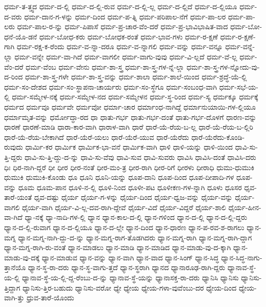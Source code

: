 {ಧರ್ಮ-ತ-ತ್ತ್ವದ
ಧರ್ಮ-ದ-ಲ್ಲಿ
ಧರ್ಮ-ದ-ಲ್ಲಿ-ರುವ
ಧರ್ಮ-ದ-ಲ್ಲಿ-ಲ್ಲ
ಧರ್ಮ-ದ-ಲ್ಲಿದೆ
ಧರ್ಮ-ದ-ಲ್ಲಿಯೂ
ಧರ್ಮ-ದ-ವರು
ಧರ್ಮ-ದಾನ-ಗ-ಳನ್ನು
ಧರ್ಮ-ದಿಂದ
ಧರ್ಮ-ಪ-ತ್ನಿ
ಧರ್ಮ-ಪರಿಪಾಲ-ನೆಗೆ
ಧರ್ಮ-ಪಾ-ಲರ
ಧರ್ಮ-ಪಾ-ಲರು
ಧರ್ಮ-ಪಾಲ-ರ-ನ್ನು
ಧರ್ಮ-ಪಿಪಾಸೆ
ಧರ್ಮ-ಪ್ರ-ಚಾರ-ವೆಂ-ದರೆ
ಧರ್ಮ-ಪ್ರ-ಭಾವಿಭಾಷಿತ-ವಾದ
ಧರ್ಮ-ಬೋ-ಧನೆ-ಯೊ-ಡನೆ
ಧರ್ಮ-ಬೋಧ-ಕರು
ಧರ್ಮ-ಬೋಧಕ-ರಂತೆ
ಧರ್ಮ-ಭಾವ-ಗಳು
ಧರ್ಮ-ರ-ಕ್ಷಣೆ
ಧರ್ಮ-ರ-ಕ್ಷಣೆ-ಗಾಗಿ
ಧರ್ಮ-ರಕ್ಷ-ಕ-ರೆಂದು
ಧರ್ಮ-ವ-ನ್ನಾ-ದರೂ
ಧರ್ಮ-ವ-ನ್ನಾಗಲಿ
ಧರ್ಮ-ವನ್ನು
ಧರ್ಮ-ವನ್ನೂ
ಧರ್ಮ-ವನ್ನೆ-ಲ್ಲಾ
ಧರ್ಮ-ವನ್ನೇ
ಧರ್ಮ-ವಾ-ಗಿದೆ
ಧರ್ಮ-ವಾಗಲೀ
ಧರ್ಮ-ವಾಗು-ವುವು
ಧರ್ಮ-ವಿ-ಲ್ಲದೆ
ಧರ್ಮ-ವೆ-ಲ್ಲ
ಧರ್ಮ-ವೆಂ-ದರೆ
ಧರ್ಮ-ವೆಂಬ
ಧರ್ಮ-ವೇನು
ಧರ್ಮ-ಶಾ-ಸ್ತ್ರ
ಧರ್ಮ-ಶಾ-ಸ್ತ್ರ-ಗಳ-ನ್ನೆ-ಲ್ಲಾ
ಧರ್ಮ-ಶಾ-ಸ್ತ್ರ-ಗಳ-ನ್ನೋದು-ವು-ದ-ರಿಂದ
ಧರ್ಮ-ಶಾ-ಸ್ತ್ರ-ಗಳೇ
ಧರ್ಮ-ಶಾ-ಸ್ತ್ರ-ವನ್ನು
ಧರ್ಮ-ಶಾಲಾ
ಧರ್ಮ-ಶಾಲೆ-ಯಿಂದ
ಧರ್ಮ-ಶ್ರದ್ಧೆ-ಯೆ-ಲ್ಲಿ
ಧರ್ಮ-ಸಂ-ದೇಶದ
ಧರ್ಮ-ಸಂ-ಸ್ಥಾಪನಾ-ಚಾರ್ಯರು
ಧರ್ಮ-ಸಂ-ಸ್ಥೆಗೂ
ಧರ್ಮ-ಸಂಬಂಧ-ವಾಗಿ
ಧರ್ಮ-ಸಭೆ-ಯ-ಲ್ಲಿ
ಧರ್ಮ-ಸಮ್ಮೇಳ-ನಕ್ಕೆ
ಧರ್ಮ-ಸಮ್ಮೇಳ-ನದ
ಧರ್ಮ-ಸಮ್ಮೇಳನ
ಧರ್ಮ-ಸ್ಥ-ರಿಂದ
ಧರ್ಮ-ಸ್ಯ
ಧರ್ಮಕ್ಕೂ
ಧರ್ಮಕ್ಕೆ
ಧರ್ಮದ
ಧರ್ಮವೂ
ಧರ್ಮವೇ
ಧರ್ಮವೋ
ಧರ್ಮಾ-ಚಾರ
ಧರ್ಮಾಂಧ-ನಾಗಿದ್ದೆ
ಧರ್ಮಾನುಯಾಯಿ-ಗಳ-ಲ್ಲಿಯೂ
ಧರ್ಮಾಮೃತ-ವನ್ನು
ಧರ್ಮೋದ್ಧಾ-ರದ
ಧಾ
ಧಾತು-ಗರ್ಭ
ಧಾತು-ಗರ್ಭ-ದಂತೆ
ಧಾತು-ಗರ್ಭ-ದೊಳಗೆ
ಧಾರಣ-ವನ್ನು
ಧಾರಣೆ
ಧಾರಣೆ-ಮಾಡಿ
ಧಾರಾ-ಕಾರ-ವಾಗಿ
ಧಾರಾಳ-ವಾಗಿ
ಧಾರೆ
ಧಾರೆ-ಯೆ-ರೆಯ-ಬ-ಲ್ಲ
ಧಾರೆ-ಯೆ-ರೆಯ-ಬ-ಲ್ಲಿರಿ
ಧಾರೆ-ಯೆ-ರೆಯ-ಬೇಕಾಗಿದೆ
ಧಾರೆ-ಯೆರೆ-ಯಲು
ಧಾರೆ-ಯೆರೆ-ಯುವ
ಧಾರೆ-ಯೆರೆದು
ಧಾರೆ-ಯೆರೆದು-ಕೊಂಡಿ-ರುವುದು
ಧಾರ್ಮಿ-ಕರ
ಧಾರ್ಮಿಕ
ಧಾರ್ಮಿಕ-ಭಾ-ವನೆ
ಧಾರ್ಮಿಕ-ವಾಗಿ
ಧಾಳಿ
ಧಾಳಿ-ಯನ್ನು
ಧಾಳಿ-ಯಿಂದ
ಧಾವಿ-ಸು-ತ್ತಿ-ದ್ದರು
ಧಾವಿ-ಸು-ತ್ತಿ-ದ್ದು-ದ-ನ್ನು
ಧಾವಿ-ಸು-ವೆವು
ಧಾವಿ-ಸುವ
ಧಾವಿ-ಸುವರು
ಧಾವಿಸಿ
ಧಾವಿಸಿ-ದಂತೆ
ಧಾವಿಸಿ-ದರು
ಧಿಃ
ಧಿರ-ನಾಗಿ-ದ್ದರೆ
ಧೀ
ಧೀರ
ಧೀರ-ನಂತೆ
ಧೀರ-ಮಂ-ತ್ರ
ಧೀರ-ರಾಗಿ
ಧೀರ-ರಿಗೆ
ಧೀರಳು
ಧೀರಾಧಿ
ಧುಮು-ಧುಮುಕಿ
ಧುಮುಕಿ
ಧುಮುಕಿ-ಕೊಂಡು
ಧೂ
ಧೂನಿ
ಧೂನಿ-ಯನ್ನು
ಧೂಪ-ದಾನಿ
ಧೂಪ-ದಿಂದ
ಧೂಪ-ದೀಪಾದಿ-ಗಳ
ಧೂಪ-ವನ್ನು
ಧೂಮ
ಧೂಮ-ಪಾನ
ಧೂಳಿ-ನ-ಲ್ಲಿ
ಧೂಳಿ-ನಿಂದ
ಧೂಳೀ-ಪಟ
ಧೂಳೀಕಣ-ಗಳ-ನ್ನಾಗಿ
ಧೂಳು
ಧೂಸರ
ಧೃವ-ತಾರೆ-ಯಂತೆ
ಧೃವ-ದಷ್ಟು
ಧೈರ್ಯ
ಧೈರ್ಯ-ಗ-ಳನ್ನು
ಧೈರ್ಯ-ದಿಂದ
ಧೈರ್ಯ-ಧ್ವಜ-ವನ್ನು
ಧೈರ್ಯ-ವನ್ನು
ಧೈರ್ಯ-ವಾಗಲಿ
ಧೈರ್ಯ-ವಾಗಿ
ಧೈರ್ಯ-ವಿ-ಲ್ಲ-ದವ-ರಾಗಿ-ದ್ದೇವೆ
ಧೈರ್ಯ-ವಿದೆ
ಧೈರ್ಯ-ವಿದ್ದರೆ
ಧೈರ್ಯ-ಶಾಲಿ
ಧೈರ್ಯ-ಹೀನ-ವಾ-ಗಿದೆ
ಧ್ಯಾ-ನಕ್ಕೆ
ಧ್ಯಾ-ನಾದಿ-ಗಳ-ಲ್ಲಿ
ಧ್ಯಾನ
ಧ್ಯಾನ-ಕಾಲ-ದ-ಲ್ಲಿ
ಧ್ಯಾನ-ಗಳಿಂದ
ಧ್ಯಾನ-ದ-ಲ್ಲಿ
ಧ್ಯಾನ-ದ-ಲ್ಲಿ-ದ್ದರು
ಧ್ಯಾನ-ದ-ಲ್ಲಿ-ರುವಾಗ
ಧ್ಯಾನ-ದ-ಲ್ಲಿಯೂ
ಧ್ಯಾನ-ದ-ಲ್ಲೇ
ಧ್ಯಾನ-ದಿಂದ
ಧ್ಯಾನ-ಧಾರಣ
ಧ್ಯಾನ-ಪ-ರವ-ಶ-ರಾಗಲು
ಧ್ಯಾನ-ಮಗ್ನ
ಧ್ಯಾನ-ಮಗ್ನ-ನಾಗಿ-ದ್ದು-ದ-ನ್ನು
ಧ್ಯಾನ-ಮಗ್ನ-ರಾಗ-ತೊಡಗಿದರು
ಧ್ಯಾನ-ಮಗ್ನ-ರಾಗಿ
ಧ್ಯಾನ-ಮಗ್ನ-ರಾಗಿ-ದ್ದಾಗ
ಧ್ಯಾನ-ಮಗ್ನ-ರಾಗಿ-ರು-ವಂತೆ
ಧ್ಯಾನ-ಮಾಡಲು
ಧ್ಯಾನ-ಮಾಡಿ
ಧ್ಯಾನ-ಮಾಡಿದ
ಧ್ಯಾನ-ಮಾಡು-ವು-ದ-ಕ್ಕಾಗಿ
ಧ್ಯಾನ-ಮಾಡು-ವು-ದಕ್ಕೆ
ಧ್ಯಾನ-ಮಾಡುವ
ಧ್ಯಾನ-ವನ್ನು
ಧ್ಯಾನ-ವಾಗಿ
ಧ್ಯಾನ-ವಾದ
ಧ್ಯಾನ-ಸಿಂಗ್
ಧ್ಯಾನ-ಸಿದ್ಧ
ಧ್ಯಾನ-ಸಿದ್ಧ-ನಾಗು-ತ್ತಾನೆಯೊ
ಧ್ಯಾನ-ಸ್ಥ-ರಾ-ದರು
ಧ್ಯಾನ-ಸ್ಥ-ವಾಗು-ತ್ತದೆ
ಧ್ಯಾನ-ಸ್ಥರಾಗಿ
ಧ್ಯಾನದ
ಧ್ಯಾನಾರೂಢ-ರಾಗಿ-ದ್ದರು
ಧ್ಯಾನಾವ-ಸ್ಥೆ-ಯ-ಲ್ಲಿ
ಧ್ಯಾನಾವ-ಸ್ಥೆ-ಯ-ಲ್ಲಿ-ದ್ದ-ರೆಂಬು-ದ-ನ್ನು
ಧ್ಯಾನಾವ-ಸ್ಥೆ-ಯನ್ನು
ಧ್ಯಾನಾಸಕ್ತ-ರಾ-ದರು
ಧ್ಯಾನಿಸಿ
ಧ್ಯಾನಿಸು
ಧ್ಯಾನಿಸು-ತ್ತಿದ್ದಾಗ
ಧ್ಯಾನಿಸು-ತ್ತಿರ-ಬಹುದು
ಧ್ಯಾನಿಸು-ವರೋ
ಧ್ಯೇ
ಧ್ಯೇಯ
ಧ್ಯೇಯ-ಗಳಾ-ವುವೆಂಬು-ದರ
ಧ್ಯೇಯ-ದಿಂದ
ಧ್ಯೇಯ-ವಾಗಿ-ತ್ತು
ಧ್ರುವ-ತಾರೆ-ಯೊಂದು
}
